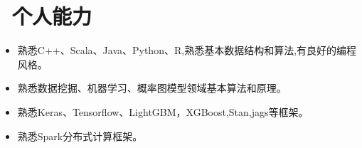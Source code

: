 \documentclass{resume}
\begin{document}



\section{\faCogs\ 个人能力}
\begin{itemize}[parsep=0.5ex]
  \item 熟悉C++、Scala、Java、Python、R,熟悉基本数据结构和算法,有良好的编程风格。
  \item 熟悉数据挖掘、机器学习、概率图模型领域基本算法和原理。
  \item 熟悉Keras、Tensorflow、LightGBM，XGBoost,Stan,jags等框架。
  \item 熟悉Spark分布式计算框架。
  
\end{itemize}


%
%
\end{document}
